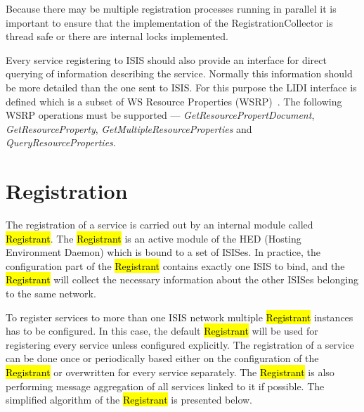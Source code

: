 \documentclass{book}
\begin{document}
Because there may be multiple registration processes running in parallel it is important to ensure that the
implementation of the RegistrationCollector is thread safe or there are internal locks implemented.

Every service registering to ISIS should also provide an interface for direct querying of information 
describing the service. Normally this information should be more detailed than the one sent to ISIS. For this 
purpose the LIDI interface is defined which is a subset of WS Resource Properties (WSRP)~\cite{wsrf-rp}. The following WSRP
operations must be supported --- \textit{GetResourcePropertDocument}, \textit{GetResourceProperty},
\textit{GetMultipleResourceProperties} and \textit{QueryResourceProperties}.




\section{Registration}
\label{sec:service_registration}

The registration of a service is carried out by an internal module called \hl{Registrant}. The \hl{Registrant} is an active module of the HED (Hosting Environment Daemon) which is bound to a set of ISISes. In practice, the configuration part of the \hl{Registrant} contains exactly one ISIS to bind, and the \hl{Registrant} will collect the necessary information about the other ISISes belonging to the same network.

To register services to more than one ISIS network multiple \hl{Registrant} instances has to be configured. In this case, the default \hl{Registrant} will be used for registering every service unless configured explicitly.
The registration of a service can be done once or periodically based either on the configuration of the \hl{Registrant} or overwritten for every service separately. The \hl{Registrant} is also performing message aggregation of all services linked to it if possible. The simplified algorithm of the \hl{Registrant} is presented below.
\end{document}
